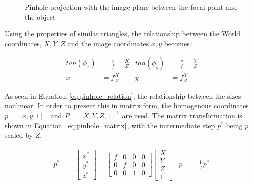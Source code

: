 \begin{figure}

    \caption{Pinhole projection with the image plane between the focal point and the object}
    \label{fig:pinhole}
    
\end{figure}

Using the properties of similar triangles, the relationship between the World coordinates, $X,Y,Z$ and the image coordinates $x,y$ becomes:

\begin{align}
    tan(\phi_x) &= \frac{x}{f} = \frac{X}{Z} & tan(\phi_y) &= \frac{y}{f} = \frac{Y}{Z} \\
    x &= f\frac{X}{Z} & y &=f\frac{Y}{Z}
    \label{eq:pinhole_relation}
\end{align}

As seen in Equation \eqref{eq:pinhole_relation}, the relationship between the sizes nonlinear. In order to present this in matrix form, the homogenous coordinates $p=[x,y,1]^\top$ and $P=[X,Y,Z,1]^\top$ are used. The matrix transformation is shown in Equation~\eqref{eq:pinhole_matrix}, with the imtermediate step $p^*$ being $p$ scaled by $Z$.

\begin{align}
    p^* &= \begin{bmatrix}
        x^* \\ y^* \\ z^*
    \end{bmatrix} = \begin{bmatrix}
        f & 0 & 0 & 0 \\
        0 & f & 0 & 0 \\
        0 & 0 & 1 & 0
    \end{bmatrix}\begin{bmatrix}
        X \\ Y \\ Z \\ 1
    \end{bmatrix} &
    p &= \frac{1}{z^*}p^*
    \label{eq:pinhole_matrix}
\end{align}

